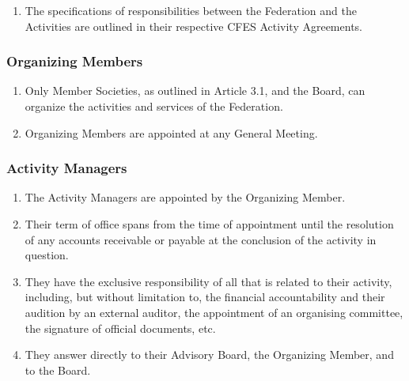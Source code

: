 \begin{enumerate}

 \item The specifications of responsibilities between the Federation and the Activities are outlined in their respective CFES Activity Agreements.
\end{enumerate}

\subsubsection{Organizing Members}
\label{organizing-members}

\begin{enumerate}
 \item Only Member Societies, as outlined in Article 3.1, and the Board, can organize the activities and services of the Federation.
 \item Organizing Members are appointed at any General Meeting.
\end{enumerate}

\subsubsection{Activity Managers}
\label{activity-managers}

\begin{enumerate}
 \item The Activity Managers are appointed by the Organizing Member.
 \item Their term of office spans from the time of appointment until the resolution of any accounts receivable or payable at the conclusion of the activity in question.
 \item They have the exclusive responsibility of all that is related to their activity, including, but without limitation to, the financial accountability and their audition by an external auditor, the appointment of an organising committee, the signature of official documents, etc.
 \item They answer directly to their Advisory Board, the Organizing Member, and to the Board.
\end{enumerate}

